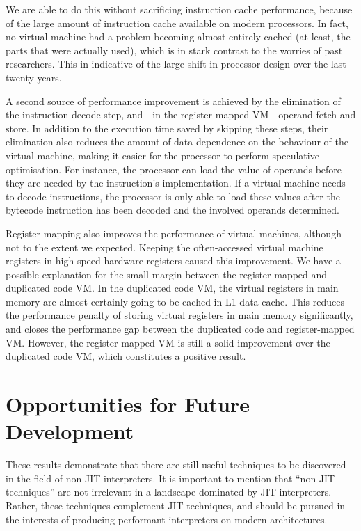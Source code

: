 	We are able to do this without sacrificing instruction cache performance, because of the large amount of instruction cache available on modern processors. In fact, no virtual machine had a problem becoming almost entirely cached (at least, the parts that were actually used), which is in stark contrast to the worries of past researchers. This in indicative of the large shift in processor design over the last twenty years.
	
	A second source of performance improvement is achieved by the elimination of the instruction decode step, and---in the register-mapped VM---operand fetch and store. In addition to the execution time saved by skipping these steps, their elimination also reduces the amount of data dependence on the behaviour of the virtual machine, making it easier for the processor to perform speculative optimisation. For instance, the processor can load the value of operands before they are needed by the instruction's implementation. If a virtual machine needs to decode instructions, the processor is only able to load these values after the bytecode instruction has been decoded and the involved operands determined.
	
	Register mapping also improves the performance of virtual machines, although not to the extent we expected. Keeping the often-accessed virtual machine registers in high-speed hardware registers caused this improvement. We have a possible explanation for the small margin between the register-mapped and duplicated code VM. In the duplicated code VM, the virtual registers in main memory are almost certainly going to be cached in L1 data cache. This reduces the performance penalty of storing virtual registers in main memory significantly, and closes the performance gap between the duplicated code and register-mapped VM. However, the register-mapped VM is still a solid improvement over the duplicated code VM, which constitutes a positive result.
	
	\section{Opportunities for Future Development}
	These results demonstrate that there are still useful techniques to be discovered in the field of non-JIT interpreters. It is important to mention that ``non-JIT techniques'' are not irrelevant in a landscape dominated by JIT interpreters. Rather, these techniques complement JIT techniques, and should be pursued in the interests of producing performant interpreters on modern architectures.
	
